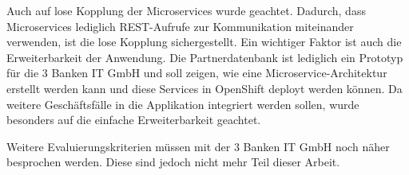 Auch auf lose Kopplung der Microservices wurde geachtet. Dadurch, dass Microservices lediglich REST-Aufrufe zur Kommunikation miteinander verwenden, ist die lose Kopplung sichergestellt. Ein wichtiger Faktor ist auch die Erweiterbarkeit der Anwendung. Die Partnerdatenbank ist lediglich ein Prototyp für die 3 Banken IT GmbH und soll zeigen, wie eine Microservice-Architektur erstellt werden kann und diese Services in OpenShift deployt werden können. Da weitere Geschäftsfälle in die Applikation integriert werden sollen, wurde besonders auf die einfache Erweiterbarkeit geachtet.

Weitere Evaluierungskriterien müssen mit der 3 Banken IT GmbH noch näher besprochen werden. Diese sind jedoch nicht mehr Teil dieser Arbeit.

